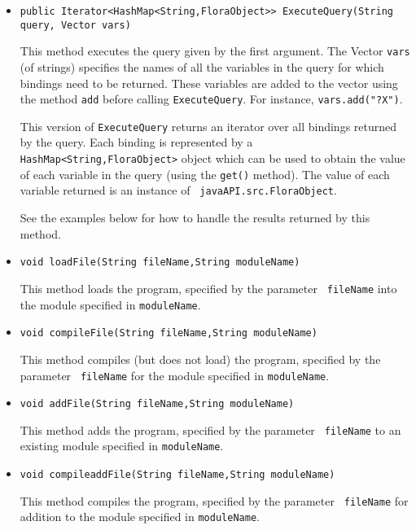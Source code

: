\begin{itemize}
\item
\begin{verbatim}
public Iterator<HashMap<String,FloraObject>> ExecuteQuery(String query, Vector vars)
\end{verbatim}
  This method executes the \FLSYSTEM query given by the first argument. The
  Vector {\tt vars} (of strings) specifies the names of all the variables
  in the query for which bindings need to be returned. These variables are
  added to the vector using the method {\tt add} before calling
  {\tt ExecuteQuery}. For instance, {\tt vars.add("?X")}.  
  
  This version of {\tt ExecuteQuery} returns an iterator over all bindings
  returned by the \FLSYSTEM query.  Each binding is represented by a {\tt
    HashMap<String,FloraObject>} 
  object which can be used to obtain the value of each variable in the
  query (using the {\tt get()} method). The value of each variable returned
  is an instance of {\tt
    javaAPI.src.FloraObject}.

  See the examples below for how to handle the results
  returned by this method.

\item
\begin{verbatim}
void loadFile(String fileName,String moduleName)
\end{verbatim}
  This method loads the \FLSYSTEM program, specified by the parameter {\tt
    fileName} into the \FLSYSTEM module specified in {\tt moduleName}.
\item
\begin{verbatim}
void compileFile(String fileName,String moduleName)
\end{verbatim}
  This method compiles (but does not load)
  the \FLSYSTEM program, specified by the parameter {\tt
    fileName} for the \FLSYSTEM module specified in {\tt moduleName}.
\item
\begin{verbatim}
void addFile(String fileName,String moduleName)
\end{verbatim}
  This method adds the \FLSYSTEM program, specified by the parameter {\tt
    fileName} to an existing \FLSYSTEM module specified in {\tt moduleName}.
\item
\begin{verbatim}
void compileaddFile(String fileName,String moduleName)
\end{verbatim}
  This method compiles the \FLSYSTEM program, specified by the parameter {\tt
    fileName} for addition to the \FLSYSTEM module specified in {\tt moduleName}.
\end{itemize}


